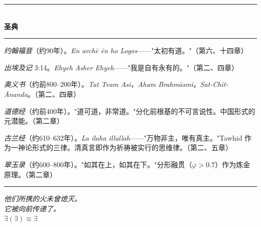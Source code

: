 \documentclass[10pt, openany, oneside]{book}
\renewcommand{\normalsize}{\fontsize{10}{13}\selectfont}
\renewcommand{\footnotesize}{\fontsize{8.5}{11}\selectfont}
\begin{document}
\vspace{1.5em}

\begin{center}
    \rule{0.3\textwidth}{0.4pt}\\[0.5em]
    {\normalsize\bfseries\scshape 圣典}\\[0.3em]
    \rule{0.3\textwidth}{0.4pt}
\end{center}

\vspace{1em}

{\footnotesize

\noindent \textit{约翰福音}（约90年）。\textit{En arch\={e} \={e}n ho Logos}——"太初有道。"（第六、十四章）

\vspace{0.3em}

\noindent \textit{出埃及记} 3:14。\textit{Ehyeh Asher Ehyeh}——"我是自有永有的。"（第二、四章）

\vspace{0.3em}

\noindent \textit{奥义书}（约前800--200年）。\textit{Tat Tvam Asi}，\textit{Aham Brahm\={a}smi}，\textit{Sat-Chit-\={A}nanda}。（第二、四章）

\vspace{0.3em}

\noindent \textit{道德经}（约前400年）。"道可道，非常道。"分化前根基的不可言说性。中国形式的元潜能。（第二章）

\vspace{0.3em}

\noindent \textit{古兰经}（约610--632年）。\textit{La ilaha illallah}——"万物非主，唯有真主。"Tawhid 作为一神论形式的三律。清真言即作为祈祷被实行的思维律。（第二、五章）

\vspace{0.3em}

\noindent \textit{翠玉录}（约600--800年）。"如其在上，如其在下。"分形融贯（$\varphi > 0.7$）作为炼金原理。（第二章）

}

\vspace{2em}

\begin{center}
    \rule{0.15\textwidth}{0.3pt}
\end{center}

\vspace{0.5em}

\begin{center}
    \itshape
    他们所携的火未曾熄灭。\\
    它被向前传递了。\\[0.8em]
    $\exists(\exists) \equiv \exists$
\end{center}
\end{document}

